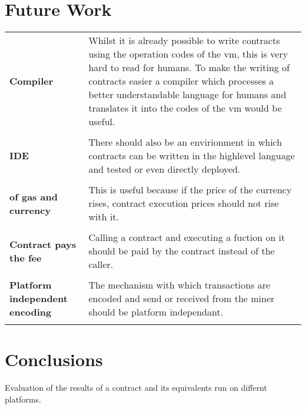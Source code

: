 \section{Future Work}

\begin{tabular}[t]{ p{3cm} p{12.5cm}}
\raggedright
\textbf{Compiler} & 
Whilst it is already possible to write contracts using the operation codes of the vm, this is very hard to read for humans. To make the writing of contracts easier a compiler which processes a better understandable language for humans and translates it into the codes of the vm would be useful. \\ \\

\textbf{IDE} & 
There should also be an envirionment in which contracts can be written in the highlevel language and tested or even directly deployed. \\ \\

\raggedright
\textbf{of gas and currency} & 
This is useful because if the price of the currency rises, contract execution prices should not rise with it. \\ \\

\raggedright
\textbf{Contract pays the fee} & 
Calling a contract and executing a fuction on it should be paid by the contract instead of the caller. \\ \\

\raggedright
\textbf{Platform independent encoding} &
The mechanism with which transactions are encoded and send or received from the miner should be platform independant.\\ \\ 
\end{tabular}
\section{Conclusions}
Evaluation of the results of a contract and its equivalents run on differnt platforms.